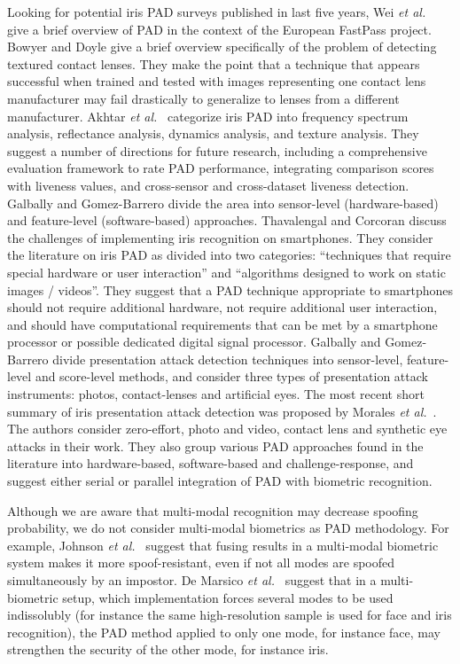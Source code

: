 \documentclass[format=acmsmall, review=false, timestamp=false]{acmart}
\newcommand{\etal}{{\it et al.}~}
\begin{document}
Looking for potential iris PAD surveys published in last five years, Wei \etal \cite{Wei_FRONTEX_2013} give a brief overview of PAD in the context of the European FastPass project. Bowyer and Doyle \cite{Bowyer_COMPUTER_2014} give a brief overview specifically of the problem of detecting textured contact lenses. They make the point that a technique that appears successful when trained and tested with images representing one contact lens manufacturer may fail drastically to generalize to lenses from a different manufacturer. Akhtar \etal \cite{Akhtar_SECURITY_2015} categorize iris PAD into frequency spectrum analysis, reflectance analysis, dynamics analysis, and texture analysis. They suggest a number of directions for future research, including a comprehensive evaluation framework to rate PAD performance, integrating comparison scores with liveness values, and cross-sensor and cross-dataset liveness detection. Galbally and Gomez-Barrero \cite{Galbally_IWBF_2016} divide the area into sensor-level (hardware-based) and feature-level (software-based) approaches. Thavalengal and Corcoran \cite{Thavalengal_CEM_2016} discuss the challenges of implementing iris recognition on smartphones. They consider the literature on iris PAD as divided into two categories: ``techniques that require special hardware or user interaction'' and ``algorithms designed to work on static images / videos''. They suggest that a PAD technique appropriate to smartphones should not require additional hardware, not require additional user interaction, and should have computational requirements that can be met by a smartphone processor or possible dedicated digital signal processor. {Galbally and Gomez-Barrero \cite{Galbally_IETbook_Ch11_2017} divide presentation attack detection techniques into sensor-level, feature-level and score-level methods, and consider three types of presentation attack instruments: photos, contact-lenses and artificial eyes. The most recent short summary of iris presentation attack detection was proposed by Morales \etal \cite{Morales_PAD_Handbook_2018}. The authors consider zero-effort, photo and video, contact lens and synthetic eye attacks in their work. They also group various PAD approaches found in the literature into hardware-based, software-based and challenge-response, and suggest either serial or parallel integration of PAD with biometric recognition.}

Although we are aware that multi-modal recognition may decrease spoofing probability{, we do not consider multi-modal biometrics as PAD methodology.} For example, Johnson \etal \cite{Johnson_IFS_2010} suggest that fusing results in a multi-modal biometric system makes it more spoof-resistant, even if not all modes are spoofed simultaneously by an impostor. De Marsico \etal \cite{DeMarsico_IVC_2014} suggest that in a multi-biometric setup, which implementation forces several modes to be used indissolubly (for instance the same high-resolution sample is used for face and iris recognition), the PAD method applied to only one mode, for instance face, may strengthen the security of the other mode, for instance iris.
\end{document}
